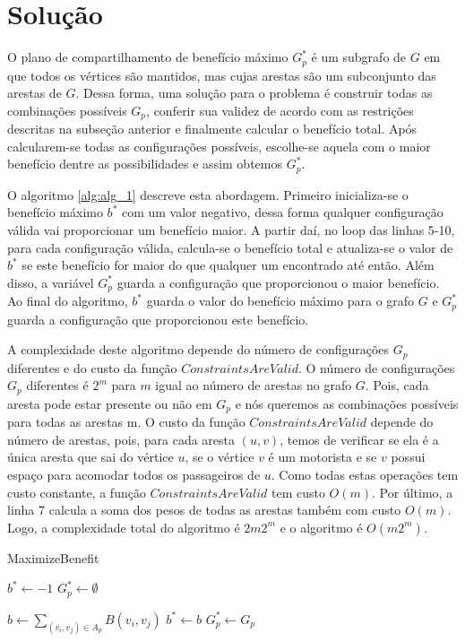 \documentclass{report}
\begin{document}
\section{Solução} 

O plano de compartilhamento de benefício máximo $ G_p^* $ é um subgrafo de $ G $ em que todos os vértices são mantidos, mas cujas
arestas são um subconjunto das arestas de $ G $. Dessa forma, uma solução para o problema é construir todas as combinações possíveis 
$ G_p $, conferir sua validez de acordo com as restrições descritas na subseção anterior e finalmente calcular o benefício total. 
Após calcularem-se todas as configurações possíveis, escolhe-se aquela com o maior benefício dentre as possibilidades e assim obtemos $ G_p^* $. 

O algoritmo \ref{alg:alg_1} descreve esta abordagem. Primeiro inicializa-se o benefício máximo $ b^* $ com um valor negativo, dessa
forma qualquer configuração válida vai proporcionar um benefício maior. A partir daí, no loop das linhas 5-10, para cada configuração
válida, calcula-se o benefício total e atualiza-se o valor de $ b^* $ se este benefício for maior do que qualquer um encontrado até então.
Além disso, a variável $ G_p^* $ guarda a configuração que proporcionou o maior benefício. Ao final do algoritmo, $ b^* $ guarda o valor 
do benefício máximo para o grafo $ G $ e $ G_p^* $ guarda a configuração que proporcionou este benefício. 

A complexidade deste algoritmo depende do número de configurações $ G_p $ diferentes e do custo da função $ ConstraintsAreValid $. O número de 
configurações $ G_p $ diferentes é $ 2^m $ para $ m $ igual ao número de arestas no grafo $ G $. Pois, cada aresta pode estar presente ou
não em $ G_p $ e nós queremos as combinações possíveis para todas as arestas m. O custo da função $ ConstraintsAreValid $ depende do número de 
arestas, pois, para cada aresta $ (u,v) $, temos de verificar se ela é a única aresta que sai do vértice $ u $, se o vértice $ v $ é um motorista
e se $ v $ possui espaço para acomodar todos os passageiros de $ u $. Como todas estas operações tem custo constante, a função $ ConstraintsAreValid $ 
tem custo $ O(m) $. Por último, a linha 7 calcula a soma dos pesos de todas as arestas também com custo $ O(m) $. Logo, 
a complexidade total do algoritmo é $ 2m2^m $ e o algoritmo é $ O(m2^m) $.

\begin{algorithm}
\caption{MaximizeBenefit}\label{euclid}
\begin{algorithmic}[1]

\State $ b^* \gets -1 $
\State $ G_p^* \gets \emptyset $
\item {}

  \State $ \textit{b} \gets \sum_{(v_i, v_j) \in A_p} B(v_i, v_j) $
    \State $ b^* \gets b $
    \State $ G_p^* \gets G_p $
  \EndIf
\EndIf
\EndProcedure
\end{algorithmic}
\label{alg:alg_1}
\end{algorithm}
\end{document}

